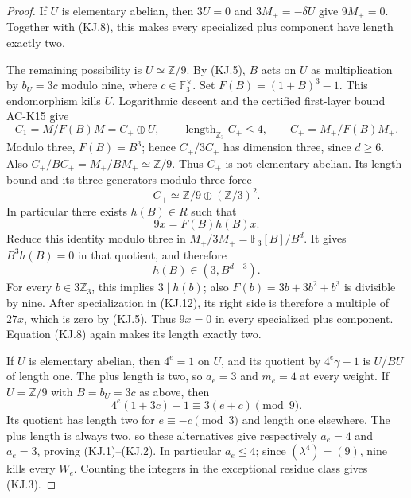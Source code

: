 \begin{proof}
If $U$ is elementary abelian, then $3U=0$ and
$3M_+=-\delta U$ give $9M_+=0$.
Together with (KJ.8), this makes every specialized
plus component have length exactly two.

The remaining possibility is $U\simeq\mathbb Z/9$.
By (KJ.5), $B$ acts on $U$ as multiplication by
$b_U=3c$ modulo nine, where $c\in\mathbb F_3^\times$.
Set $F(B)=(1+B)^3-1$.
This endomorphism kills $U$.
Logarithmic descent and the certified first-layer bound
AC-K15 give
\[
 C_1=M/F(B)M=C_+\oplus U,
 \qquad \operatorname{length}_{\mathbb Z_3}C_+\leq4,
 \qquad C_+=M_+/F(B)M_+.                             \tag{KJ.10}
\]
Modulo three, $F(B)=B^3$; hence $C_+/3C_+$ has
dimension three, since $d\geq6$.
Also $C_+/BC_+=M_+/BM_+\simeq\mathbb Z/9$.
Thus $C_+$ is not elementary abelian.
Its length bound and its three generators modulo three
force
\[
                   C_+\simeq\mathbb Z/9\oplus
                                     (\mathbb Z/3)^2.
                                                               \tag{KJ.11}
\]
In particular there exists $h(B)\in R$ such that
\[
                       9x=F(B)h(B)x.                \tag{KJ.12}
\]
Reduce this identity modulo three in
$M_+/3M_+=\mathbb F_3[B]/B^d$.
It gives $B^3h(B)=0$ in that quotient, and therefore
\[
                       h(B)\in(3,B^{d-3}).          \tag{KJ.13}
\]
For every $b\in3\mathbb Z_3$, this implies
$3\mid h(b)$; also
$F(b)=3b+3b^2+b^3$ is divisible by nine.
After specialization in (KJ.12), its right side is
therefore a multiple of $27x$, which is zero by
(KJ.5).  Thus $9x=0$ in every specialized plus
component.  Equation (KJ.8) again makes its length
exactly two.

If $U$ is elementary abelian, then $4^e=1$ on $U$,
and its quotient by $4^e\gamma-1$ is $U/BU$ of
length one.  The plus length is two, so $a_e=3$
and $m_e=4$ at every weight.
If $U=\mathbb Z/9$ with $B=b_U=3c$ as above, then
\[
                  4^e(1+3c)-1\equiv3(e+c)\pmod9.
                                                               \tag{KJ.14}
\]
Its quotient has length two for $e\equiv-c\pmod3$
and length one elsewhere.
The plus length is always two, so these alternatives
give respectively $a_e=4$ and $a_e=3$, proving
(KJ.1)--(KJ.2).  In particular $a_e\leq4$;
since $(\lambda^4)=(9)$, nine kills every $W_e$.
Counting the integers in the exceptional residue class
gives (KJ.3).
\end{proof}

